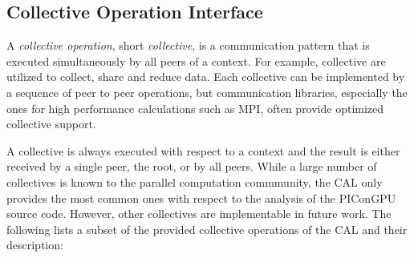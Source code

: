 \subsection{Collective Operation Interface}
\label{sec:cal_collective}
A \textit{collective operation}, short \textit{collective}, is a
communication pattern that is executed simultaneously by all peers of
a context. For example, collective are utilized to collect, share and
reduce data.  Each collective can be implemented by a sequence of peer
to peer operations, but communication libraries, especially the ones
for high performance calculations such as MPI, often provide optimized
collective support.

A collective is always executed with respect to a context and the
result is either received by a single peer, the root, or by all peers.
While a large number of collectives is known to the parallel
computation commmunity, the CAL only provides the most common ones
with respect to the analysis of the PIConGPU source code.  However,
other collectives are implementable in future work. The following
lists a subset of the provided collective operations of the CAL and
their description:


